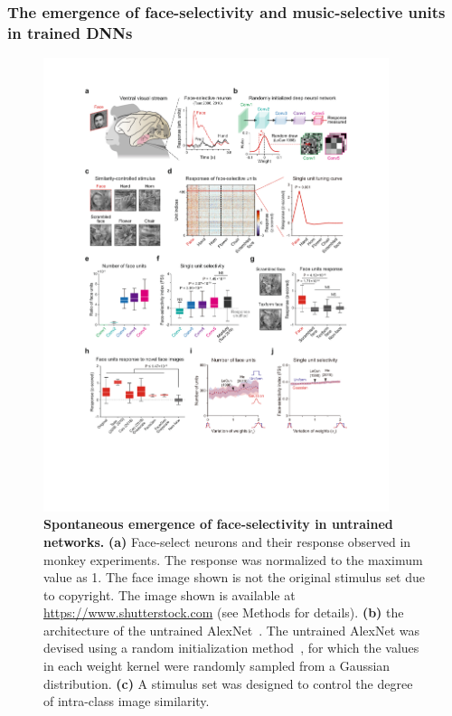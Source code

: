 \documentclass[sn-mathphys-num]{sn-jnl}%
\theoremstyle{thmstyleone}%
\theoremstyle{thmstyletwo}%
\theoremstyle{thmstylethree}%
\begin{document}
\subsubsection{The emergence of face-selectivity and music-selective units in trained DNNs}


\begin{figure}[!htb]
	\centering
	\includegraphics[width=0.9\textwidth]{fig/face_1.pdf}
	\caption{
		\textbf{Spontaneous emergence of face-selectivity in untrained networks.
		}
		\textbf{(a)} Face-select neurons and their response observed in monkey experiments.
		The response was normalized to the maximum value as 1.
		The face image shown is not the original stimulus set due to copyright.
		The image shown is available at \url{https://www.shutterstock.com} (see Methods for details).
		\textbf{(b)} the architecture of the untrained AlexNet~\cite{krizhevsky2012imagenet}.
		The untrained AlexNet was devised using a random initialization method~\cite{lecun2002efficient}, for which the values in each weight kernel were randomly sampled from a Gaussian distribution.
		\textbf{(c)} A stimulus set was designed to control the degree of intra-class image similarity.
}
\end{figure}
\end{document}
